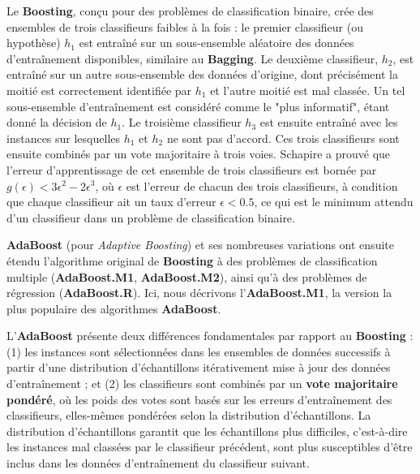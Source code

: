 Le \textbf{Boosting}, conçu pour des problèmes de classification binaire, crée des ensembles de trois classifieurs faibles à la fois : le premier classifieur (ou hypothèse) $h_1$ est entraîné sur un sous-ensemble aléatoire des données d'entraînement disponibles, similaire au \textbf{Bagging}. Le deuxième classifieur, $h_2$, est entraîné sur un autre sous-ensemble des données d'origine, dont précisément la moitié est correctement identifiée par $h_1$ et l'autre moitié est mal classée. Un tel sous-ensemble d'entraînement est considéré comme le "plus informatif", étant donné la décision de $h_1$. Le troisième classifieur $h_3$ est ensuite entraîné avec les instances sur lesquelles $h_1$ et $h_2$ ne sont pas d'accord. Ces trois classifieurs sont ensuite combinés par un vote majoritaire à trois voies. Schapire a prouvé que l'erreur d'apprentissage de cet ensemble de trois classifieurs est bornée par $g(\epsilon) < 3\epsilon^2 - 2\epsilon^3$, où $\epsilon$ est l'erreur de chacun des trois classifieurs, à condition que chaque classifieur ait un taux d'erreur $\epsilon < 0.5$, ce qui est le minimum attendu d'un classifieur dans un problème de classification binaire.

\textbf{AdaBoost} (pour \textit{Adaptive Boosting}) et ses nombreuses variations ont ensuite étendu l'algorithme original de \textbf{Boosting} à des problèmes de classification multiple (\textbf{AdaBoost.M1}, \textbf{AdaBoost.M2}), ainsi qu'à des problèmes de régression (\textbf{AdaBoost.R}). Ici, nous décrivons l'\textbf{AdaBoost.M1}, la version la plus populaire des algorithmes \textbf{AdaBoost}.

L'\textbf{AdaBoost} présente deux différences fondamentales par rapport au \textbf{Boosting} : (1) les instances sont sélectionnées dans les ensembles de données successifs à partir d'une distribution d'échantillons itérativement mise à jour des données d'entraînement ; et (2) les classifieurs sont combinés par un \textbf{vote majoritaire pondéré}, où les poids des votes sont basés sur les erreurs d'entraînement des classifieurs, elles-mêmes pondérées selon la distribution d'échantillons. La distribution d'échantillons garantit que les échantillons plus difficiles, c'est-à-dire les instances mal classées par le classifieur précédent, sont plus susceptibles d'être inclus dans les données d'entraînement du classifieur suivant.

